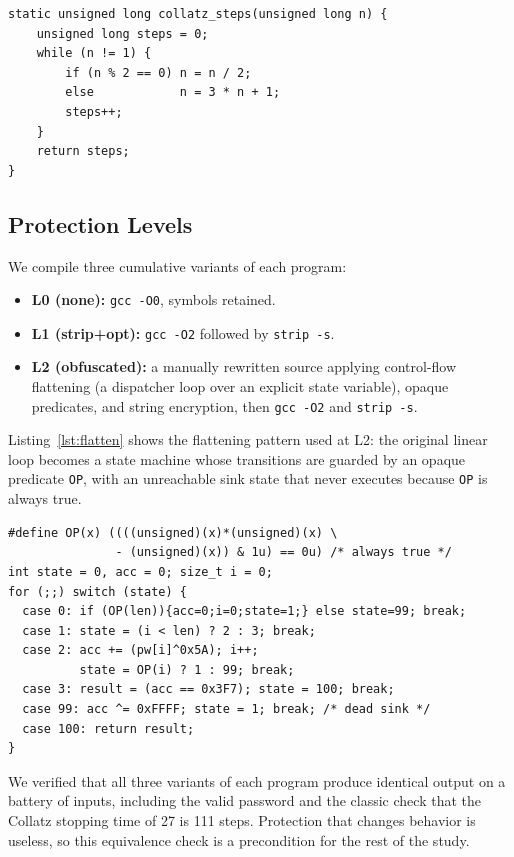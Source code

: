 \documentclass[conference]{IEEEtran}
\begin{document}
\begin{lstlisting}[style=ccode,caption={P2 Collatz stopping time (unprotected).},label={lst:p2}]
static unsigned long collatz_steps(unsigned long n) {
    unsigned long steps = 0;
    while (n != 1) {
        if (n % 2 == 0) n = n / 2;
        else            n = 3 * n + 1;
        steps++;
    }
    return steps;
}
\end{lstlisting}

\subsection{Protection Levels}
We compile three cumulative variants of each program:
\begin{itemize}
\item \textbf{L0 (none):} \texttt{gcc -O0}, symbols retained.
\item \textbf{L1 (strip+opt):} \texttt{gcc -O2} followed by \texttt{strip -s}.
\item \textbf{L2 (obfuscated):} a manually rewritten source applying control-flow
flattening (a dispatcher loop over an explicit state variable), opaque
predicates, and string encryption, then \texttt{gcc -O2} and \texttt{strip -s}.
\end{itemize}
Listing~\ref{lst:flatten} shows the flattening pattern used at L2: the original
linear loop becomes a state machine whose transitions are guarded by an opaque
predicate \texttt{OP}, with an unreachable sink state that never executes because
\texttt{OP} is always true.

\begin{lstlisting}[style=ccode,caption={Control-flow flattening at L2 (P1 validator, abridged).},label={lst:flatten}]
#define OP(x) ((((unsigned)(x)*(unsigned)(x) \
               - (unsigned)(x)) & 1u) == 0u) /* always true */
int state = 0, acc = 0; size_t i = 0;
for (;;) switch (state) {
  case 0: if (OP(len)){acc=0;i=0;state=1;} else state=99; break;
  case 1: state = (i < len) ? 2 : 3; break;
  case 2: acc += (pw[i]^0x5A); i++;
          state = OP(i) ? 1 : 99; break;
  case 3: result = (acc == 0x3F7); state = 100; break;
  case 99: acc ^= 0xFFFF; state = 1; break; /* dead sink */
  case 100: return result;
}
\end{lstlisting}

We verified that all three variants of each program produce identical output on a
battery of inputs, including the valid password and the classic check that the
Collatz stopping time of 27 is 111 steps. Protection that changes behavior is
useless, so this equivalence check is a precondition for the rest of the study.
\end{document}
